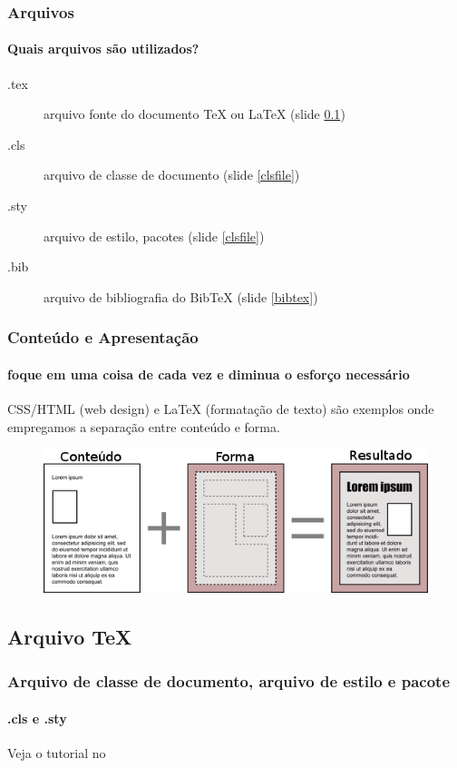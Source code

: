 \begin{frame}
\frametitle{Arquivos}
\framesubtitle{Quais arquivos são utilizados?}
\begin{description}
\item[.tex] arquivo fonte do documento \TeX{} ou \LaTeX{} (slide \ref{sec:tex})
\item[.cls] arquivo de classe de documento (slide \ref{clsfile})
\item[.sty] arquivo de estilo, pacotes (slide \ref{clsfile})
\item[.bib] arquivo de bibliografia do BibTeX (slide \ref{bibtex})
\end{description}
\end{frame}

\begin{frame}
\frametitle{Conteúdo e Apresentação}
\framesubtitle{foque em uma coisa de cada vez e diminua o esforço necessário}
  CSS/HTML (web design) e \LaTeX{} (formatação de texto) são exemplos onde empregamos a separação entre conteúdo e forma.
  \begin{figure}[h!]
  \centering
  \includegraphics[width=\textwidth]{figures/content_design.png}
  \label{fig:content_design}
  \end{figure}
\end{frame}



\subsection{Arquivo \TeX{}}\label{sec:tex}



\begin{frame}[label={clsfile}]
\frametitle{Arquivo de classe de documento, arquivo de estilo e pacote}
\framesubtitle{.cls e .sty}
Veja o tutorial no  
\end{frame}
